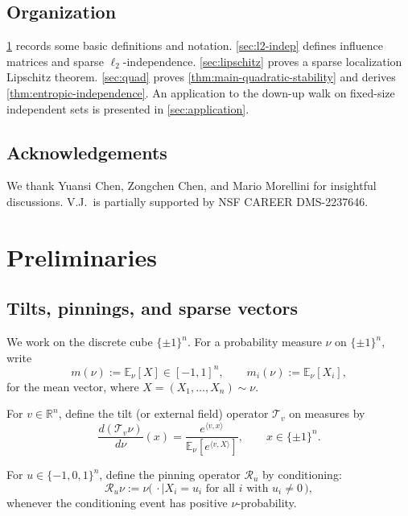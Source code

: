 \documentclass[11pt,reqno,letterpaper]{amsart}
\numberwithin{equation}{section}
\theoremstyle{definition}
\begin{document}
\subsection{Organization}

\cref{sec:prelims} records some basic definitions and notation. 
\cref{sec:l2-indep} defines influence matrices and sparse $\ell_2$-independence. \cref{sec:lipschitz} proves a sparse localization Lipschitz theorem. \cref{sec:quad} proves \cref{thm:main-quadratic-stability} and derives
\cref{thm:entropic-independence}. An application to the down-up walk on fixed-size independent sets is presented in \cref{sec:application}. 

\subsection{Acknowledgements} 
We thank Yuansi Chen, Zongchen Chen, and Mario Morellini for insightful discussions. V.J.~is partially supported by NSF CAREER DMS-2237646. 


    


\section{Preliminaries}
\label{sec:prelims}
\subsection{Tilts, pinnings, and sparse vectors}
We work on the discrete cube $\{\pm 1\}^n$. For a probability measure $\nu$ on $\{\pm 1\}^n$, write
\[
m(\nu) := \mathbb{E}_\nu[X] \in [-1,1]^n,
\qquad
m_i(\nu) := \mathbb{E}_\nu[X_i],
\]
for the mean vector, where $X=(X_1,\dots,X_n)\sim \nu$. 

For $v\in\mathbb{R}^n$, define the {tilt} (or external field) operator $\mathcal{T}_v$ on measures by
\begin{equation}
\label{eq:TiltDef}
\frac{d(\mathcal{T}_v \nu)}{d\nu}(x)
=
\frac{e^{\langle v,x\rangle}}{\mathbb{E}_\nu[e^{\langle v,X\rangle}]},
\qquad x\in\{\pm 1\}^n.
\end{equation}

For $u\in\{-1,0,1\}^n$, define the {pinning} operator $\mathcal{R}_u$ by conditioning:
\begin{equation}
\label{eq:PinDef}
\mathcal{R}_u \nu := \nu\bigl(\,\cdot\mid X_i = u_i\text{ for all }i\text{ with }u_i\neq 0\,\bigr),
\end{equation}
whenever the conditioning event has positive $\nu$-probability. 
\end{document}
